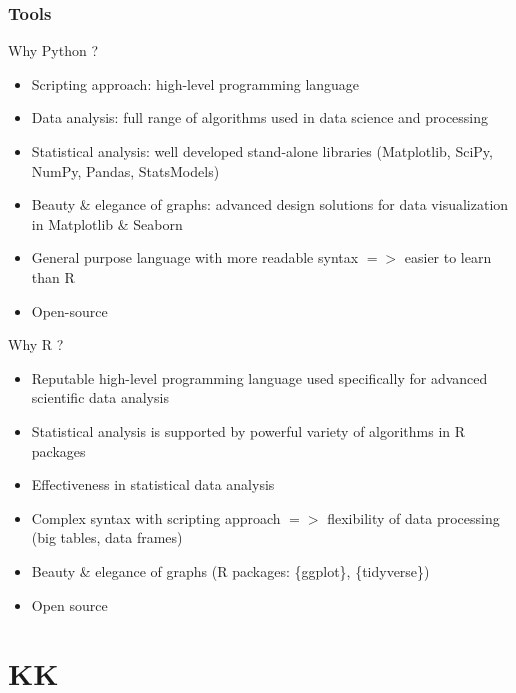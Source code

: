 \documentclass[pdflatex,compress,8pt,
	xcolor={dvipsnames,dvipsnames,svgnames,x11names,table},
	hyperref={colorlinks = true,breaklinks = true, urlcolor = NavyBlue, breaklinks = true}]{beamer}
\begin{document}
\begin{frame}\frametitle{Tools}
\vspace{1em}
\begin{exampleblock}{Why Python ?}
\begin{itemize}
	 \item Scripting approach: high-level programming language
	 \item Data analysis: full range of algorithms used in data science and processing
	 \item Statistical analysis: well developed stand-alone libraries (Matplotlib, SciPy, NumPy, Pandas, StatsModels)
	 \item Beauty \& elegance of graphs: advanced design solutions for data visualization in Matplotlib \& Seaborn
	 \item General purpose language with more readable syntax $=>$ easier to learn than R
	 \item Open-source
\end{itemize}
\end{exampleblock}
\begin{exampleblock}{Why R ?}
\begin{itemize}
	 \item Reputable high-level programming language used specifically for advanced scientific data analysis 
	 \item Statistical analysis is supported by powerful variety of algorithms in R packages 
	 \item Effectiveness in statistical data analysis
	 \item Complex syntax with scripting approach $=>$ flexibility of data processing (big tables, data frames)
	 \item Beauty \& elegance of graphs (R packages: \{ggplot\}, \{tidyverse\})
	 \item Open source 
\end{itemize}
\end{exampleblock}
\end{frame}
\section{KK}
\end{document}
